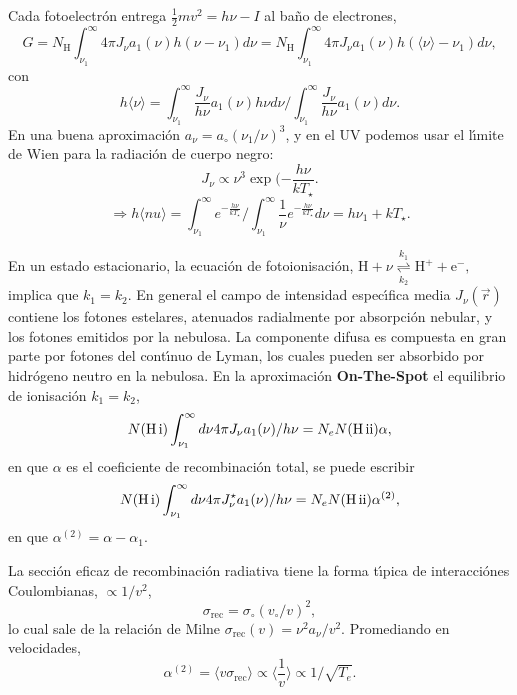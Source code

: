 
Cada fotoelectr\'on entrega $\frac{1}{2} m v^2 = h \nu - I $ al ba\~no
de electrones, 
\[ 
G = N_\mathrm{H} \int_{\nu_1}^{\infty} 4 \pi J_\nu a_1(\nu) h (\nu -
\nu_1) d\nu  = N_\mathrm{H} \int_{\nu_1}^{\infty} 4 \pi J_\nu a_1(\nu) h (\langle
\nu \rangle  - \nu_1) d\nu,
\]
con 
\[
h\langle \nu \rangle = \int_{\nu_1}^{\infty} \frac{J_\nu}{h\nu}
a_1(\nu) h \nu d\nu  / \int_{\nu_1}^{\infty} \frac{J_\nu}{h\nu} a_1(\nu)  d\nu.
\]
En una buena aproximaci\'on $a_\nu = a_\circ (\nu_1/\nu)^3$, y en el
UV podemos usar el l\'{\i}mite de Wien para la radiaci\'on de cuerpo negro:
\[
J_\nu  \propto \nu^3 \exp(- \frac{h \nu} {k T_\star}. 
\]
\[\Rightarrow h \langle nu \rangle = \int_{\nu_1}^{\infty}
e^{-\frac{h\nu}{kT_\star}} / \int_{\nu_1}^{\infty} \frac{1}{\nu}
e^{-\frac{h\nu}{kT_\star}} d\nu = h\nu_1 + k T_\star. \]



En un estado estacionario, la ecuaci\'on de fotoionisaci\'on, $
\mathrm{H} + \nu \overset{k_1}{\underset{k_2}{\rightleftharpoons}}
\mathrm{H}^+ + \mathrm{e}^- , $ implica que $k_1 = k_2 $. En general
el campo de intensidad espec\'{\i}fica media $J_\nu(\vec{r})$ contiene
los fotones estelares, atenuados radialmente por absorpci\'on nebular,
y los fotones emitidos por la nebulosa.  La componente difusa es
compuesta en gran parte por fotones del cont\'{\i}nuo de Lyman, los
cuales pueden ser absorbido por hidr\'ogeno neutro en la nebulosa. En
la aproximaci\'on {\bf On-The-Spot} el equilibrio de ionisaci\'on $k_1
= k_2$,
\[
N(\mathrm{H\,{\sc i}})  \int_{\nu_1}^{\infty} d\nu  4 \pi J_\nu a_1(\nu)  / h
\nu = N_e N(\mathrm{H\,{\sc ii}}) \alpha, 
\]
en que $\alpha$ es el coeficiente de recombinaci\'on total, se puede
escribir
\[
N(\mathrm{H\,{\sc i}})  \int_{\nu_1}^{\infty} d\nu  4 \pi J^\star_\nu a_1(\nu)  / h
\nu = N_e N(\mathrm{H\,{\sc ii}}) \alpha^{(2)}, 
\]
en que $\alpha^{(2)} = \alpha - \alpha_1$.




 La secci\'on eficaz de
recombinaci\'on radiativa tiene la forma t\'{\i}pica de
interacci\'ones Coulombianas, $\propto 1/v^2$, 
\[
\sigma_\mathrm{rec} = \sigma_\circ (v_\circ/v)^2, 
\]
lo cual sale de la relaci\'on de Milne $\sigma_\mathrm{rec}(v) = \nu^2
a_\nu / v^2.$ Promediando en velocidades, 
\[
\alpha^{(2)} =  \langle v \sigma_\mathrm{rec} \rangle \propto
\langle  \frac{1}{v}   \rangle \propto 1/\sqrt{T_e}.
\]

